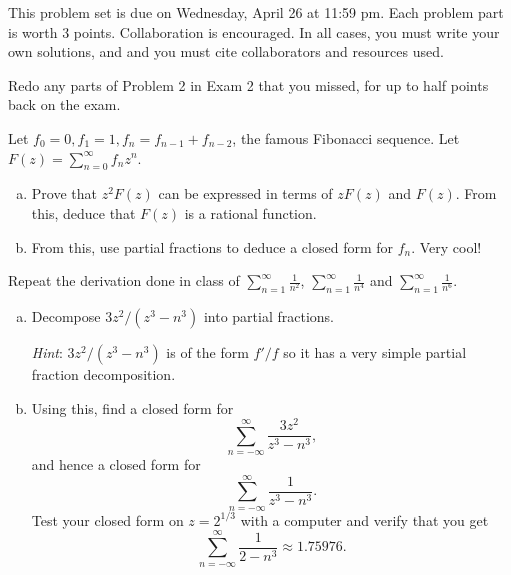 \maketitle

This problem set is due on Wednesday, April 26 at 11:59 pm. Each problem part is worth 3 points. Collaboration is encouraged. In all cases, you must write your own solutions, and and you must cite collaborators and resources used.

\begin{problem}
  Redo any parts of Problem 2 in Exam 2 that you missed, for up to half points back on the exam.
\end{problem}

\begin{problem}
  Let $f_0=0,f_1=1,f_n=f_{n-1}+f_{n-2}$, the famous Fibonacci sequence. Let $F(z)=\sum_{n=0}^\infty f_nz^n$.
  \begin{enumerate}[(a)]
    \item Prove that $z^2F(z)$ can be expressed in terms of $zF(z)$ and $F(z)$. From this, deduce that $F(z)$ is a rational function.
    \item From this, use partial fractions to deduce a closed form for $f_n$. Very cool!
  \end{enumerate}
\end{problem}

\begin{problem}
  Repeat the derivation done in class of $\displaystyle\sum_{n=1}^\infty\frac 1{n^2}$, $\displaystyle\sum_{n=1}^\infty\frac 1{n^4}$ and $\displaystyle\sum_{n=1}^\infty\frac 1{n^6}$.
\end{problem}

\begin{problem}
  \leavevmode\begin{enumerate}[(a)]
    \item Decompose $3z^2/(z^3-n^3)$ into partial fractions.
    
    \emph{Hint}: $3z^2/(z^3-n^3)$ is of the form $f'/f$ so it has a very simple partial fraction decomposition.

    \item Using this, find a closed form for
    \[\sum_{n=-\infty}^{\infty}\frac {3z^2}{z^3-n^3},\]
    and hence a closed form for 
    \[\sum_{n=-\infty}^\infty\frac 1{z^3-n^3}.\]
    Test your closed form on $z=2^{1/3}$ with a computer and verify that you get
    \[\sum_{n=-\infty}^\infty \frac 1{2-n^3}\approx 1.75976.\]
  \end{enumerate}
\end{problem}

